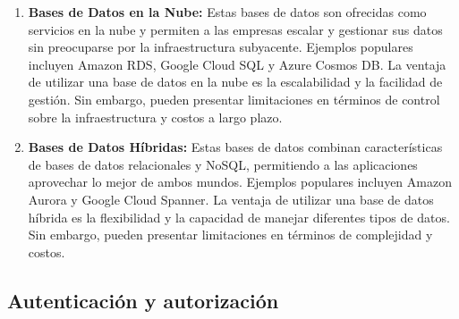 \begin{enumerate}
    \item \textbf{Bases de Datos en la Nube:} Estas bases de datos son ofrecidas como servicios en la nube y permiten a las empresas escalar y gestionar sus datos sin preocuparse por la infraestructura subyacente. Ejemplos populares incluyen Amazon RDS, Google Cloud SQL y Azure Cosmos DB.\newline
        La ventaja de utilizar una base de datos en la nube es la escalabilidad y la facilidad de gestión. Sin embargo, pueden presentar limitaciones en términos de control sobre la infraestructura y costos a largo plazo.

    \item \textbf{Bases de Datos Híbridas:} Estas bases de datos combinan características de bases de datos relacionales y NoSQL, permitiendo a las aplicaciones aprovechar lo mejor de ambos mundos. Ejemplos populares incluyen Amazon Aurora y Google Cloud Spanner.\newline
        La ventaja de utilizar una base de datos híbrida es la flexibilidad y la capacidad de manejar diferentes tipos de datos. Sin embargo, pueden presentar limitaciones en términos de complejidad y costos.
\end{enumerate}

\subsection{Autenticación y autorización}

